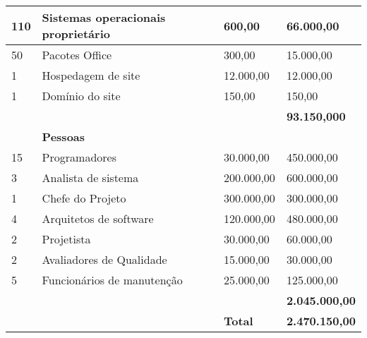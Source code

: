 \begin{table}[H]
\begin{tabular}{|l|l|l|l|}
       110                       & Sistemas operacionais proprietário & 600,00                             & 66.000,00                        \\ \hline
       50                        & Pacotes Office                     & 300,00                             & 15.000,00                        \\ \hline
       1                         & Hospedagem de site                 & 12.000,00                          & 12.000,00                        \\ \hline
       1                         & Domínio do site                    & 150,00                             & 150,00                           \\ \hline
                                 & \textbf{}                          &                                    & \textbf{93.150,000}              \\ \hline
                                 & \textbf{Pessoas}                   &                                    &                                  \\ \hline
       15                        & Programadores                      & 30.000,00                          & 450.000,00                       \\ \hline
       3                         & Analista de sistema                & 200.000,00                         & 600.000,00                       \\ \hline
       1                         & Chefe do Projeto                   & 300.000,00                         & 300.000,00                       \\ \hline
       4                         & Arquitetos de software             & 120.000,00                         & 480.000,00                       \\ \hline
       2                         & Projetista                         & 30.000,00                          & 60.000,00                        \\ \hline
       2                         & Avaliadores de Qualidade           & 15.000,00                          & 30.000,00                        \\ \hline
       5                         & Funcionários de manutenção         & 25.000,00                          & 125.000,00                       \\ \hline
                                 & \textbf{}                          &                                    & \textbf{2.045.000,00}            \\ \hline
                                 &                                    & \textbf{Total}                     & \textbf{2.470.150,00}            \\ \hline
       \end{tabular}
       \end{table}

